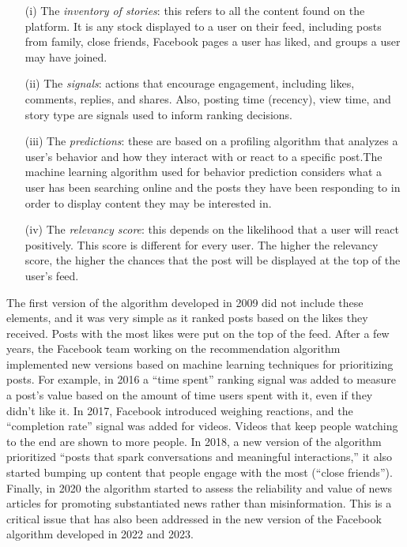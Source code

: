\begin{enumerate}
\item[(i)] The \textit{inventory of stories}: this refers to all the content found on the platform. It is any stock displayed to a user on their feed, including posts from family, close friends, Facebook pages a user has liked, and groups a user may have joined.
\item[(ii)] The \textit{signals}: actions that encourage engagement, including likes, comments, replies, and shares. Also, posting time (recency), view time, and story type are signals used to inform ranking decisions.
\item[(iii)] The \textit{predictions}: these are based on a profiling algorithm that analyzes a user's behavior and how they interact with or react to a specific post.\break The machine learning algorithm used for behavior prediction considers what a user has been searching online and the posts they have been responding to in order to display content they may be interested in.
\item[(iv)] The \textit{relevancy score}: this depends on the likelihood that a user will react positively. This score is different for every user. The higher the relevancy score, the higher the chances that the post will be displayed at the top of the user's feed.
\end{enumerate}

The first version of the algorithm developed in 2009 did not include these elements, and it was very simple as it ranked posts based on the likes they received. Posts with the most likes were put on the top of the feed. After a few years, the Facebook team working on the recommendation algorithm implemented new versions based on machine learning techniques for prioritizing posts. For example, in 2016 a ``time spent'' ranking signal was added to measure a post's value based on the amount of time users spent with it, even if they didn't like it. In 2017, Facebook introduced weighing reactions, and the ``completion rate'' signal was added for videos. Videos that keep people watching to the end are shown to more people. In 2018, a new version of the algorithm prioritized ``posts that spark conversations and meaningful interactions,'' it also started bumping up content that people engage with the most (``close friends''). Finally, in 2020 the algorithm started to assess the reliability and value of news articles for promoting substantiated news rather than misinformation. This is a critical issue that has also been addressed in the new version of the Facebook algorithm developed in 2022 and 2023.

